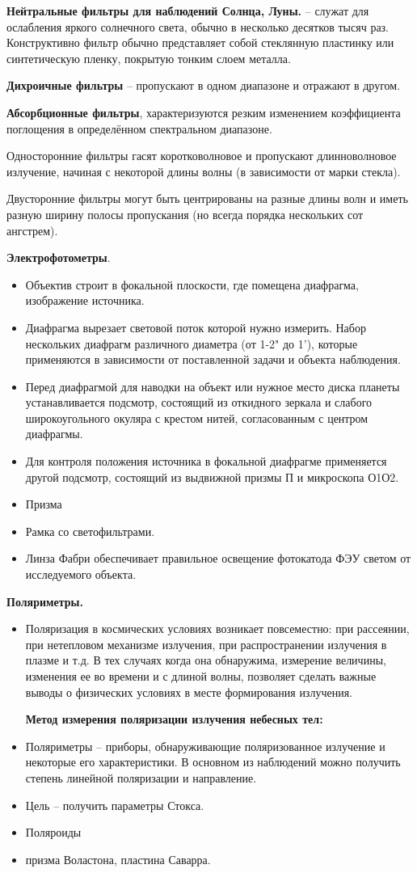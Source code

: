 \documentclass[12pt]{article}
\begin{document}
\textbf{Нейтральные фильтры для наблюдений Солнца,
Луны.} -- служат для ослабления яркого солнечного
света, обычно в несколько десятков тысяч раз.
Конструктивно фильтр обычно представляет
собой стеклянную пластинку или
синтетическую пленку, покрытую тонким слоем
металла.

\textbf{Дихроичные фильтры} -- пропускают в одном диапазоне и отражают в другом.

\textbf{Абсорбционные фильтры}, характеризуются резким изменением
коэффициента поглощения в определённом спектральном диапазоне.

Односторонние фильтры гасят
коротковолновое и пропускают
длинноволновое излучение, начиная с
некоторой длины волны (в зависимости
от марки стекла).


Двусторонние фильтры могут
быть центрированы на разные
длины волн и иметь разную
ширину полосы пропускания (но
всегда порядка нескольких сот
ангстрем).


\textbf{Электрофотометры}.
\begin{itemize}
\item Объектив строит в фокальной плоскости, где помещена диафрагма,
изображение источника.
\item Диафрагма вырезает световой поток которой нужно измерить.
Набор нескольких диафрагм различного диаметра (от 1-2" до 1'),
которые применяются в зависимости от поставленной задачи и
объекта наблюдения.
\item Перед диафрагмой для наводки на объект или нужное место диска
планеты устанавливается подсмотр, состоящий из откидного
зеркала и слабого широкоугольного окуляра с крестом нитей,
согласованным с центром диафрагмы.
\item Для контроля положения источника в фокальной диафрагме
применяется другой подсмотр, состоящий из выдвижной призмы П
и микроскопа О1О2.
\item Призма
\item Рамка со светофильтрами.
\item  Линза Фабри обеспечивает правильное освещение фотокатода
ФЭУ светом от исследуемого объекта.
\end{itemize}

\textbf{Поляриметры.}
\begin{itemize}
\item  Поляризация в космических условиях возникает повсеместно: при рассеянии, при нетепловом
механизме излучения, при распространении излучения в плазме и т.д. В тех случаях когда она
обнаружима, измерение величины, изменения ее во времени и с длиной волны, позволяет сделать
важные выводы о физических условиях в месте формирования излучения. \newpage


\textbf{ Метод измерения поляризации излучения небесных тел:}
\item  Поляриметры – приборы, обнаруживающие поляризованное излучение и некоторые его
характеристики. В основном из наблюдений можно получить степень линейной поляризации и
направление.
\item  Цель – получить параметры Стокса.
\item  Поляроиды
\item  призма Воластона, пластина Саварра.
\end{itemize}
\end{document}
